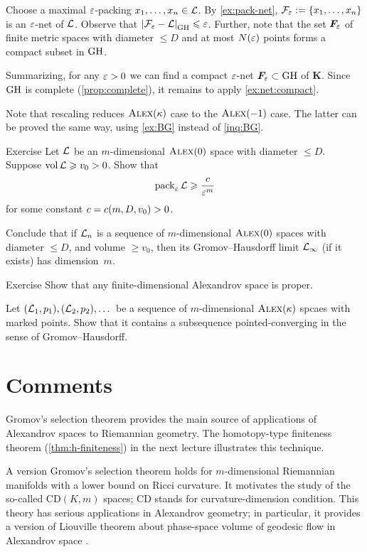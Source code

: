 Choose a maximal $\varepsilon$-packing $x_1,\z\dots,x_n\in \spc{L}$.
By \ref{ex:pack-net}, $\spc{F}_\eps\z\df\{x_1,\z\dots,x_n\}$ is an $\varepsilon$-net of $\mathcal{L}$.
Observe that $\dist{\spc{F}_\eps}{\spc{L}}{\GH}\le \eps$.
Further, note that the set $\bm{F}_\varepsilon$ of finite metric spaces with diameter $\le D$ and at most $N(\varepsilon)$ points forms a compact subset in $\operatorname{\rm GH}\nolimits$.

Summarizing, for any $\varepsilon>0$ we can find a compact $\varepsilon$-net $\bm{F}_\varepsilon\subset \operatorname{\rm GH}\nolimits$ of $\bm{K}$.
Since $\operatorname{\rm GH}\nolimits$ is complete (\ref{prop:complete}), it remains to apply \ref{ex:net:compact}.

Note that rescaling reduces $\textsc{Alex}(\kappa)$ case to the $\textsc{Alex}(-1)$ case.
The latter can be proved the same way, using \ref{ex:BG} instead of \ref{inq:BG}.
\qeds

\begin{thm}{Exercise}\label{ex:pack-vol}
Let $\mathcal{L}$ be an $m$-dimensional $\textsc{Alex}(0)$ space with diameter $\le D$.
Suppose $\operatorname{\rm vol}\nolimits\mathcal{L}\geqslant v_0>0$.
Show that 
\[\operatorname{\rm pack}\nolimits_\varepsilon\mathcal{L}\geqslant \frac{c}{\varepsilon^m}\]
for some constant $c=c(m,D,v_0)>0$.

Conclude that if $\mathcal{L}_n$ is a sequence of $m$-dimensional $\textsc{Alex}(0)$ spaces with diameter $\le D$, and volume $\ge v_0$, then its Gromov--Hausdorff limit $\mathcal{L}_\infty$ (if it exists) has dimension~$m$.%
\end{thm}

\begin{thm}{Exercise}\label{ex:diam-compact}
Show that any finite-dimensional Alexandrov space is proper.

Let $(\mathcal{L}_1,p_1),(\mathcal{L}_2,p_2),\dots$ be a sequence of $m$-dimensional $\textsc{Alex}(\kappa)$ spcaes with marked points.
Show that it contains a subsequence pointed-converging in the sense of Gromov--Hausdorff. 
\end{thm}

\section{Comments}

Gromov's selection theorem provides the main source of applications of Alexandrov spaces to Riemannian geometry.
The homotopy-type finiteness theorem (\ref{thm:h-finiteness}) in the next lecture illustrates this technique.

A version Gromov's selection theorem holds for $m$-dimensional Riemannian manifolds with a lower bound on Ricci curvature.
It motivates the study of the so-called $\mathrm{CD}(K,m)$ spaces; $\mathrm{CD}$ stands for curvature-dimension condition.
This theory has serious applications in Alexandrov geometry;
in particular, it provides a version of Liouville theorem about phase-space volume of geodesic flow in Alexandrov space \cite{brue-mondino-semola}.
